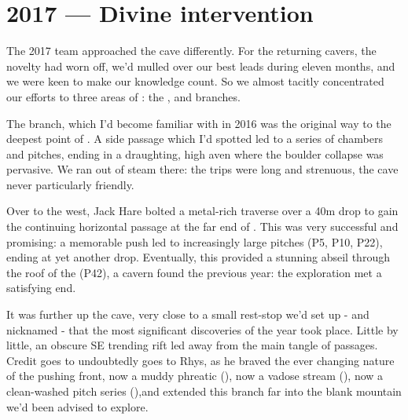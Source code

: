 \section{2017 --- Divine intervention}
The 2017 team approached the cave differently. For the returning cavers, the novelty had worn off, we'd mulled over our best leads during eleven months, and we were keen to make our knowledge count. So we almost tacitly concentrated our efforts to three areas of : the ,  and  branches.

The  branch, which I'd become familiar with in 2016 was the original way to the deepest point of . A side passage which I'd spotted led to a series of chambers and pitches, ending in a draughting, high aven where the boulder collapse was pervasive. We ran out of steam there: the trips were long and strenuous, the cave never particularly friendly.

Over to the west, Jack Hare bolted a metal-rich traverse over a 40m drop to gain the continuing horizontal passage at the far end of . This was very successful and promising: a memorable push led to increasingly large pitches (P5, P10, P22), ending at yet another drop. Eventually, this provided a stunning abseil through the roof of the  (P42), a cavern found the previous year: the exploration met a satisfying end.

It was further up the cave, very close to a small rest-stop we'd set up - and nicknamed  - that the most significant discoveries of the year took place. Little by little, an obscure SE trending rift led away from the main tangle of passages. Credit goes to undoubtedly goes to Rhys, as he braved the ever changing nature of the pushing front, now a muddy phreatic (), now a vadose stream (), now a clean-washed pitch series (),and extended this branch far into the blank mountain we'd been advised to explore.  

